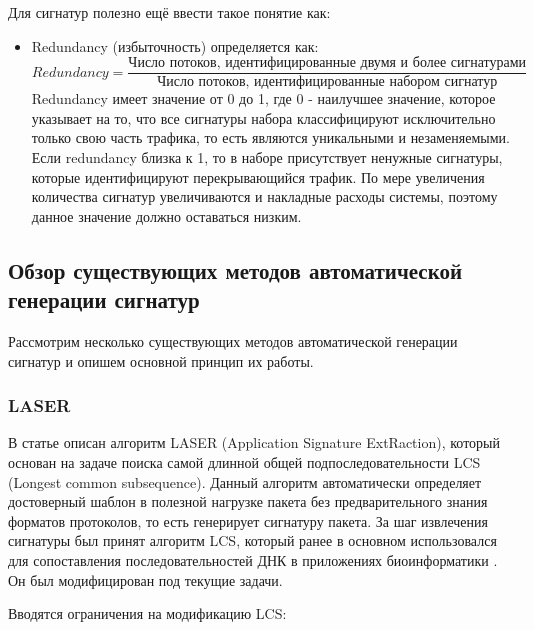Для сигнатур полезно ещё ввести такое понятие как:

\begin{itemize}
    \item Redundancy (избыточность) определяется как:
    $$ \textit{Redundancy} = \frac{\text{Число потоков, идентифицированные двумя и более сигнатурами}}{\text{Число потоков, идентифицированные набором сигнатур}}$$
    Redundancy имеет значение от 0 до 1, где 0 - наилучшее значение, которое указывает на то, что все сигнатуры набора классифицируют исключительно только свою часть трафика,
    то есть являются уникальными и незаменяемыми. Если redundancy близка к 1, то в наборе присутствует ненужные сигнатуры, которые идентифицируют перекрывающийся трафик.
    По мере увеличения количества сигнатур увеличиваются и накладные расходы системы, поэтому данное значение должно оставаться низким.
\end{itemize}

\subsection{Обзор существующих методов автоматической генерации сигнатур}

Рассмотрим несколько существующих методов автоматической генерации сигнатур и опишем основной принцип их работы.

\subsubsection{LASER}

В статье \cite{park2008towards} описан алгоритм LASER (Application Signature ExtRaction),
который основан на задаче поиска самой длинной общей подпоследовательности LCS (Longest common subsequence).
Данный алгоритм автоматически определяет достоверный шаблон в полезной нагрузке пакета без предварительного знания форматов протоколов, то есть генерирует сигнатуру пакета.
За шаг извлечения сигнатуры был принят алгоритм LCS, который ранее в основном использовался для сопоставления последовательностей ДНК в приложениях биоинформатики \cite{ning2006finding}.
Он был модифицирован под текущие задачи.

Вводятся ограничения на модификацию LCS:


